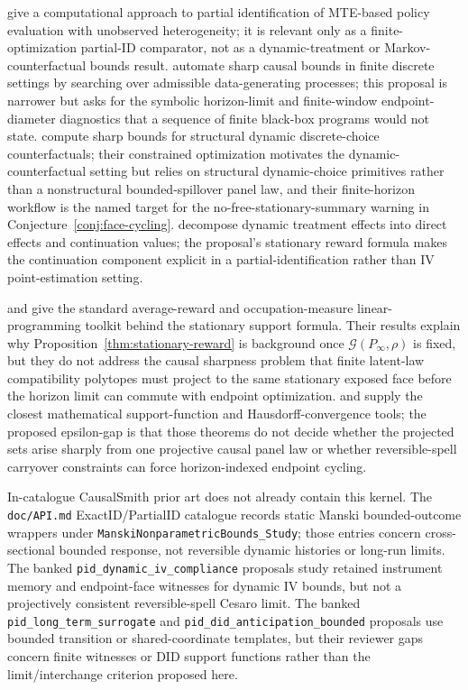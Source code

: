 \documentclass[11pt]{article}
\theoremstyle{definition}
\theoremstyle{plain}
\theoremstyle{remark}
\begin{document}
\citet{HanYang2024} give a computational approach to partial identification of MTE-based policy evaluation with unobserved heterogeneity; it is relevant only as a finite-optimization partial-ID comparator, not as a dynamic-treatment or Markov-counterfactual bounds result.  \citet{DuarteFinkelsteinKnoxMummoloShpitser2024} automate sharp causal bounds in finite discrete settings by searching over admissible data-generating processes; this proposal is narrower but asks for the symbolic horizon-limit and finite-window endpoint-diameter diagnostics that a sequence of finite black-box programs would not state.  \citet{KalouptsidiKitamuraLimaSouzaRodrigues2020} compute sharp bounds for structural dynamic discrete-choice counterfactuals; their constrained optimization motivates the dynamic-counterfactual setting but relies on structural dynamic-choice primitives rather than a nonstructural bounded-spillover panel law, and their finite-horizon workflow is the named target for the no-free-stationary-summary warning in Conjecture~\ref{conj:face-cycling}.  \citet{HeckmanHumphriesVeramendi2016} decompose dynamic treatment effects into direct effects and continuation values; the proposal's stationary reward formula makes the continuation component explicit in a partial-identification rather than IV point-estimation setting.

\citet{Puterman1994} and \citet{Altman1999} give the standard average-reward and occupation-measure linear-programming toolkit behind the stationary support formula.  Their results explain why Proposition~\ref{thm:stationary-reward} is background once \(\mathcal G(P_{\infty},\rho)\) is fixed, but they do not address the causal sharpness problem that finite latent-law compatibility polytopes must project to the same stationary exposed face before the horizon limit can commute with endpoint optimization.  \citet{Schneider1993} and \citet{RockafellarWets1998} supply the closest mathematical support-function and Hausdorff-convergence tools; the proposed epsilon-gap is that those theorems do not decide whether the projected sets arise sharply from one projective causal panel law or whether reversible-spell carryover constraints can force horizon-indexed endpoint cycling.

In-catalogue CausalSmith prior art does not already contain this kernel.  The \texttt{doc/API.md} ExactID/PartialID catalogue records static Manski bounded-outcome wrappers under \texttt{ManskiNonparametricBounds\_Study}; those entries concern cross-sectional bounded response, not reversible dynamic histories or long-run limits.  The banked \texttt{pid\_dynamic\_iv\_compliance} proposals study retained instrument memory and endpoint-face witnesses for dynamic IV bounds, but not a projectively consistent reversible-spell Cesaro limit.  The banked \texttt{pid\_long\_term\_surrogate} and \texttt{pid\_did\_anticipation\_bounded} proposals use bounded transition or shared-coordinate templates, but their reviewer gaps concern finite witnesses or DID support functions rather than the limit/interchange criterion proposed here.
\end{document}

